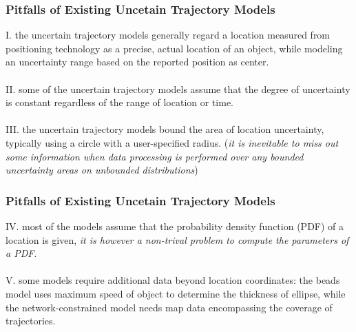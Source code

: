 
\begin{frame}
\frametitle{Pitfalls of Existing Uncetain Trajectory Models}

\textrm{I.} \quad the uncertain trajectory models generally regard a location measured from positioning technology as a precise, actual location of an object, while modeling an uncertainty range based on the reported position as center.\\~\\

\textrm{II.} \quad some of the uncertain trajectory models assume that the degree of uncertainty is constant regardless of the range of location or time.\\~\\

\textrm{III.} \quad the uncertain trajectory models bound the area of location uncertainty, typically using a circle with a user-specified radius. (\emph{it is inevitable to miss out some information when data processing is performed over any bounded uncertainty areas on unbounded distributions})

\end{frame}


\begin{frame}
\frametitle{Pitfalls of Existing Uncetain Trajectory Models}

\textrm{IV.} \quad most of the models assume that the probability density function (PDF) of a location is given, \emph{it is however a non-trival problem to compute the parameters of a PDF}. \\~\\

\textrm{V.} \quad some models require additional data beyond location coordinates: the beads model uses maximum speed of object to determine the thickness of ellipse, while the network-constrained model needs map data encompassing the coverage of trajectories.

\end{frame}


